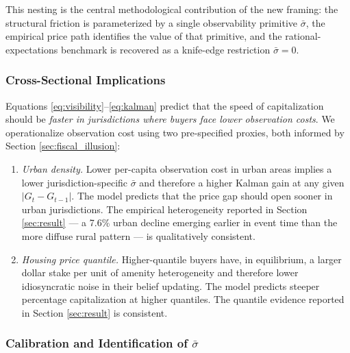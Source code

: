 This nesting is the central methodological contribution of the new framing: the structural friction is parameterized by a single observability primitive $\bar{\sigma}$, the empirical price path identifies the value of that primitive, and the rational-expectations benchmark is recovered as a knife-edge restriction $\bar{\sigma} = 0$.

\subsubsection{Cross-Sectional Implications}

Equations \ref{eq:visibility}--\ref{eq:kalman} predict that the speed of capitalization should be {\it faster in jurisdictions where buyers face lower observation costs}. We operationalize observation cost using two pre-specified proxies, both informed by Section \ref{sec:fiscal_illusion}:

\begin{enumerate}
\item {\it Urban density.} Lower per-capita observation cost in urban areas implies a lower jurisdiction-specific $\bar{\sigma}$ and therefore a higher Kalman gain at any given $|G_t - G_{t-1}|$. The model predicts that the price gap should open sooner in urban jurisdictions. The empirical heterogeneity reported in Section \ref{sec:result} --- a 7.6\% urban decline emerging earlier in event time than the more diffuse rural pattern --- is qualitatively consistent.

\item {\it Housing price quantile.} Higher-quantile buyers have, in equilibrium, a larger dollar stake per unit of amenity heterogeneity and therefore lower idiosyncratic noise in their belief updating. The model predicts steeper percentage capitalization at higher quantiles. The quantile evidence reported in Section \ref{sec:result} is consistent.
\end{enumerate}

\subsubsection{Calibration and Identification of \texorpdfstring{$\bar{\sigma}$}{sigmabar}}

